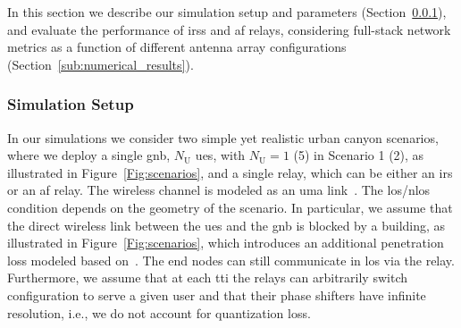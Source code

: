 In this section we describe our simulation setup and parameters (Section~\ref{sub:simulation_setup}), and evaluate the performance of \glspl{irs} and \gls{af} relays, considering full-stack network metrics as a function of different antenna array configurations (Section~\ref{sub:numerical_results}).

\subsubsection{Simulation Setup} %
\label{sub:simulation_setup}

In our simulations we consider two simple yet realistic urban canyon scenarios, where we deploy a single \gls{gnb}, $N_{\mathrm U}$ \glspl{ue}, with $N_{\mathrm U}=1$ (5) in Scenario 1 (2), as illustrated in Figure~\ref{Fig:scenarios}, and a single relay, which can be either an \gls{irs} or an \gls{af} relay.
The wireless channel is modeled as an \gls{uma} link~\cite{3gpp.38.901}. %
The \gls{los}/\gls{nlos} condition depends on the geometry of the scenario.
In particular, we assume that the direct wireless link between the \glspl{ue} and the \gls{gnb} is blocked by a building, as illustrated in Figure~\ref{Fig:scenarios}, which introduces an additional penetration loss modeled based on~\cite[Section 7.4.3.1]{3gpp.38.901}.
The end nodes can still communicate in \gls{los} via the relay. 
Furthermore, we assume that at each \gls{tti} the relays can arbitrarily switch configuration to serve a given user and that their phase shifters have infinite resolution, i.e., we do not account for quantization loss.

